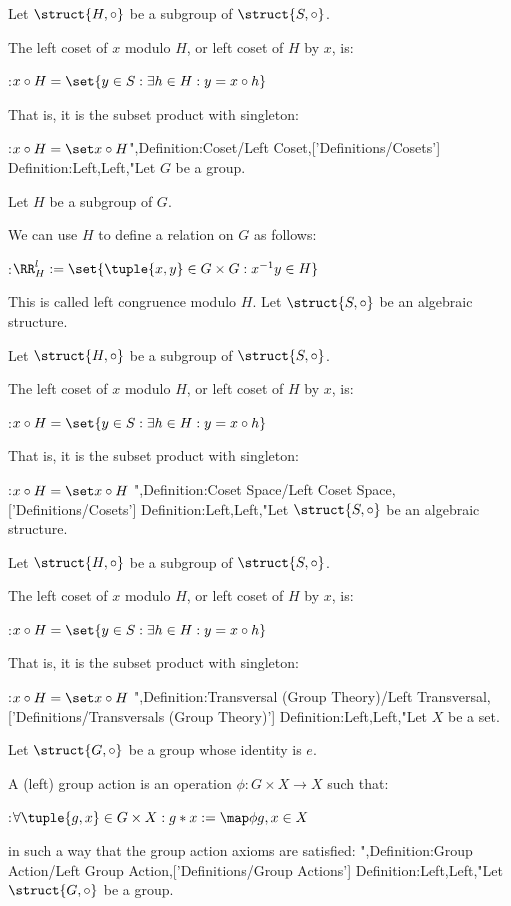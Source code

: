 Let $\struct {H, \circ}$ be a subgroup of $\struct {S, \circ}$.


The left coset of $x$ modulo $H$, or left coset of $H$ by $x$, is:

:$x \circ H = \set {y \in S: \exists h \in H: y = x \circ h}$


That is, it is the subset product with singleton:

:$x \circ H = \set x \circ H$",Definition:Coset/Left Coset,['Definitions/Cosets']
Definition:Left,Left,"Let $G$ be a group.

Let $H$ be a subgroup of $G$.


We can use $H$ to define a relation on $G$ as follows:

:$\RR^l_H := \set {\tuple {x, y} \in G \times G: x^{-1} y \in H}$

This is called left congruence modulo $H$.
Let $\struct {S, \circ}$ be an algebraic structure.

Let $\struct {H, \circ}$ be a subgroup of $\struct {S, \circ}$.


The left coset of $x$ modulo $H$, or left coset of $H$ by $x$, is:

:$x \circ H = \set {y \in S: \exists h \in H: y = x \circ h}$


That is, it is the subset product with singleton:

:$x \circ H = \set x \circ H$
",Definition:Coset Space/Left Coset Space,['Definitions/Cosets']
Definition:Left,Left,"Let $\struct {S, \circ}$ be an algebraic structure.

Let $\struct {H, \circ}$ be a subgroup of $\struct {S, \circ}$.


The left coset of $x$ modulo $H$, or left coset of $H$ by $x$, is:

:$x \circ H = \set {y \in S: \exists h \in H: y = x \circ h}$


That is, it is the subset product with singleton:

:$x \circ H = \set x \circ H$
",Definition:Transversal (Group Theory)/Left Transversal,['Definitions/Transversals (Group Theory)']
Definition:Left,Left,"Let $X$ be a set.

Let $\struct {G, \circ}$ be a group whose identity is $e$.


A (left) group action is an operation $\phi: G \times X \to X$ such that:

:$\forall \tuple {g, x} \in G \times X: g * x := \map \phi {g, x} \in X$

in such a way that the group action axioms are satisfied:
",Definition:Group Action/Left Group Action,['Definitions/Group Actions']
Definition:Left,Left,"Let $\struct {G, \circ}$ be a group.

